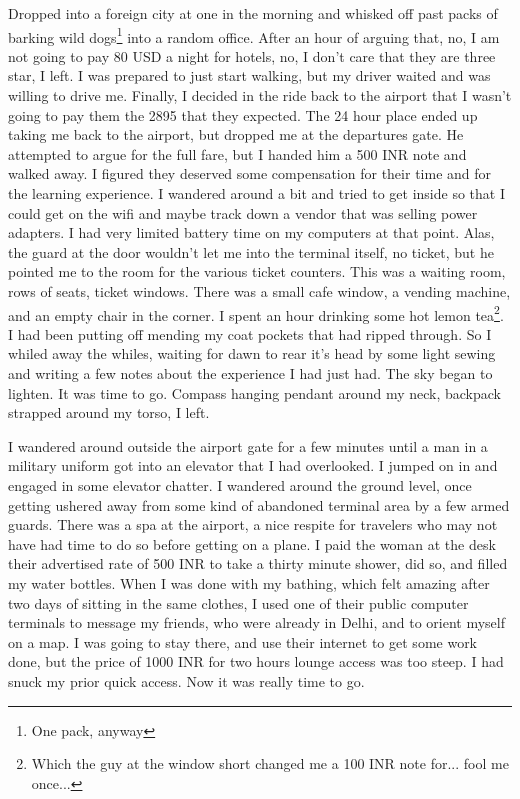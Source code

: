 \documentclass[11pt]{amsart}
\begin{document}
Dropped into a foreign city at one in the morning and whisked off past packs of barking wild dogs\footnote{One pack, anyway} into a random office. After an hour of arguing that, no,  I am not going to pay 80 USD a night for hotels, no, I don't care that they are three star, I left. I was prepared to just start walking, but my driver waited and was willing to drive me. Finally, I decided in the ride back to the airport that I wasn't going to pay them the 2895 that they expected. The 24 hour place ended up taking me back to the airport, but dropped me at the departures gate. He attempted to argue for the full fare, but I handed him a 500 INR note and walked away. I figured they deserved some compensation for their time and for the learning experience. I wandered around a bit and tried to get inside so that I could get on the wifi and maybe track down a vendor that was selling power adapters. I had very limited battery time on my computers at that point. Alas, the guard at the door wouldn't let me into the terminal itself, no ticket, but he pointed me to the room for the various ticket counters. This was a waiting room, rows of seats, ticket windows. There was a small cafe window, a vending machine, and an empty chair in the corner. I spent an hour drinking some hot lemon tea\footnote{Which the guy at the window short changed me a 100 INR note for...  fool me once...}. I had been putting off mending my coat pockets that had ripped through. So I whiled away the whiles, waiting for dawn to rear it's head by some light sewing and writing a few notes about the experience I had just had. The sky began to lighten. It was time to go. Compass hanging pendant around my neck, backpack strapped around my torso, I left.

I wandered around outside the airport gate for a few minutes until a man in a military uniform got into an elevator that I had overlooked. I jumped on in and engaged in some elevator chatter. I wandered around the ground level, once getting ushered away from some kind of abandoned terminal area by a few armed guards. There was a spa at the airport, a nice respite for travelers who may not have had time to do so before getting on a plane. I paid the woman at the desk their advertised rate of 500 INR to take a thirty minute shower, did so, and filled my water bottles.  When I was done with my bathing, which felt amazing after two days of sitting in the same clothes, I used one of their public computer terminals to message my friends, who were already in Delhi, and to orient myself on a map. I was going to stay there, and use their internet to get some work done, but the price of 1000 INR for two hours lounge access was too steep. I had snuck my prior quick access. Now it was really time to go.
\end{document}
